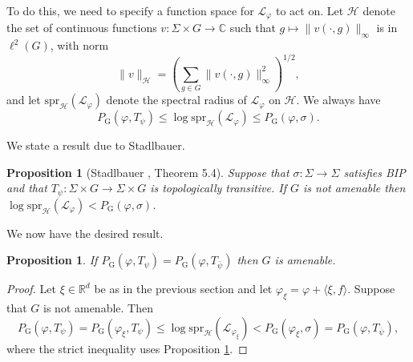 \documentclass[11pt,letterpaper]{amsart}
\newtheorem{proposition}[theorem]{Proposition}
\theoremstyle{definition}
\numberwithin{equation}{section}
\numberwithin{theorem}{section}
\def\R{\mathbb{R}}
\def\C{\mathbb{C}}
\def\vp{\varphi}
\def\R{\mathbb R}
\def\PG{P_{\mathrm{G}}}
\begin{document}
To do this, we need to specify a function space for $\mathcal L_\vp$ to act on.
Let $\mathcal H$ denote the set of continuous functions
$v : \Sigma \times G \to \C$ such that $g \mapsto \|v(\cdot,g)\|_\infty$ is in $\ell^2(G)$, with norm
\[
\|v\|_{\mathcal H} = \left(\sum_{g \in G} \|v(\cdot,g)\|_\infty^2\right)^{1/2},
\]
and let $\mathrm{spr}_{\mathcal H}(\mathcal L_\vp)$ denote the spectral radius of $\mathcal L_\vp$ on
$\mathcal H$.
We always have 
\[
\PG(\vp,T_\psi) \le \log \mathrm{spr}_{\mathcal H}(\mathcal L_{\vp}) \le \PG(\vp,\sigma).
\]


We state a result due to Stadlbauer.

\begin{proposition}[Stadlbauer \cite{Stadlbauer2013}, Theorem 5.4]\label{prop:Stadlbauer}
Suppose that $\sigma : \Sigma \to \Sigma$  satisfies BIP 
and that $T_\psi : \Sigma \times G \to \Sigma \times G$ is topologically transitive.
If $G$ is not amenable then $\log \mathrm{spr}_{\mathcal H}(\mathcal L_\vp) <\PG(\vp,\sigma)$.
\end{proposition}

We now have the desired result.

\begin{proposition}\label{prop:eia}
If $\PG(\vp,T_\psi)=\PG(\vp,T_{\bar \psi})$ then 
$G$ is amenable.
\end{proposition}


\begin{proof}
Let $\xi \in \R^d$ be as in the previous section and let $\vp_\xi = \vp +\langle \xi,f \rangle$.
Suppose that $G$ is not amenable. Then
\[
\PG(\vp,T_\psi) = \PG(\vp_\xi,T_\psi) \le \log \mathrm{spr}_{\mathcal H}(\mathcal L_{\vp_\xi})
< \PG(\vp_\xi,\sigma) = \PG(\vp,T_{\bar \psi}),
\]
where the strict inequality uses Proposition \ref{prop:Stadlbauer}.
\end{proof}
\end{document}
